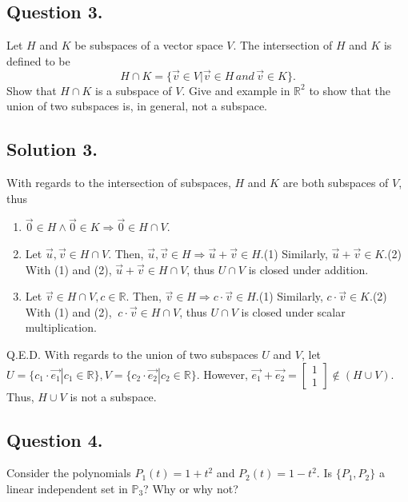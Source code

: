 \documentclass{article}
\begin{document}
\subsection*{Question 3.}
Let $H$ and $K$ be subspaces of a vector space $V$. The intersection of $H$ and $K$ is defined to be
\[H\cap K=\{\Vec{v} \in V | \Vec{v} \in H \, and\, \Vec{v} \in K\}.\]
Show that $H\cap K$ is a subspace of $V$. Give and example in $\mathbb{R}^2$ to show that the union of two subspaces is, in general, not a subspace.
\subsection*{Solution 3.}
With regards to the intersection of subspaces,
$H$ and $K$ are both subspaces of $V$, thus
\begin{enumerate}
    \item $\vec{0}\in H \land \vec{0}\in K\Rightarrow \vec{0}\in H\cap V$.
    \item Let $\vec{u},\vec{v}\in H\cap V$.\newline
    Then, $\vec{u},\vec{v}\in H\Rightarrow \vec{u}+\vec{v}\in H$.(1)\newline
    Similarly, $\vec{u}+\vec{v}\in K$.(2) \newline 
    With (1) and (2), $\vec{u}+\vec{v}\in H \cap V$, thus $U\cap V$ is closed under addition.
    \item Let $\vec{v}\in H\cap V, c\in \mathbb{R}$.\newline
    Then, $\vec{v}\in H\Rightarrow c \cdot \vec{v}\in H$.(1)\newline
    Similarly, $c\cdot \vec{v}\in K$.(2) \newline 
    With (1) and (2), $\ c \cdot\vec{v}\in H \cap V$, thus $U\cap V$ is closed under scalar multiplication.
\end{enumerate}
Q.E.D.\newline
With regards to the union of two subspaces $U$ and $V$,
let $U=\{c_1\cdot \vec{e_1}|c_1\in\mathbb{R}\},V=\{c_2\cdot \vec{e_2}|c_2\in\mathbb{R}\}$.\newline
However, $\vec{e_1}+\vec{e_2}=\left[\begin{array}{c}1\\1\end{array}\right]\notin (H\cup V)$. Thus, $H\cup V$ is not a subspace.
\subsection*{Question 4.}
Consider the polynomials $P_1(t)=1+t^2$ and $P_2(t)=1-t^2$. Is $\{P_1,P_2\}$ a linear independent set in $\mathbb{P}_3$? Why or why not?
\end{document}
